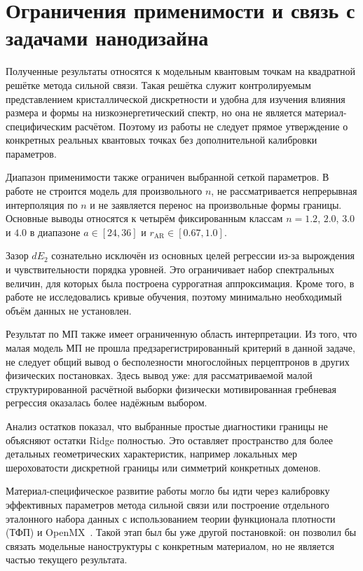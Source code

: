 \section{Ограничения применимости и связь с задачами нанодизайна}

Полученные результаты относятся к модельным квантовым точкам на квадратной решётке метода
сильной связи. Такая решётка служит контролируемым представлением кристаллической
дискретности и удобна для изучения влияния размера и формы на низкоэнергетический спектр,
но она не является материал-специфическим расчётом. Поэтому из работы не следует прямое
утверждение о конкретных реальных квантовых точках без дополнительной калибровки
параметров.

Диапазон применимости также ограничен выбранной сеткой параметров. В работе не строится
модель для произвольного $n$, не рассматривается непрерывная интерполяция по $n$ и не
заявляется перенос на произвольные формы границы. Основные выводы относятся к четырём
фиксированным классам $n=1.2$, $2.0$, $3.0$ и $4.0$ в диапазоне $a \in [24,36]$ и
$r_{\mathrm{AR}} \in [0.67,1.0]$.

Зазор $dE_2$ сознательно исключён из основных целей регрессии из-за вырождения и
чувствительности порядка уровней. Это ограничивает набор спектральных величин, для которых
была построена суррогатная аппроксимация. Кроме того, в работе не исследовались кривые
обучения, поэтому минимально необходимый объём данных не установлен.

Результат по МП также имеет ограниченную область интерпретации. Из того, что малая модель
МП не прошла предзарегистрированный критерий в данной задаче, не следует общий вывод о
бесполезности многослойных перцептронов в других физических постановках. Здесь вывод уже:
для рассматриваемой малой структурированной расчётной выборки физически мотивированная
гребневая регрессия оказалась более надёжным выбором.

Анализ остатков показал, что выбранные простые диагностики границы не объясняют остатки
Ridge полностью. Это оставляет пространство для более детальных геометрических
характеристик, например локальных мер шероховатости дискретной границы или симметрий
конкретных доменов.

Материал-специфическое развитие работы могло бы идти через калибровку эффективных
параметров метода сильной связи или построение отдельного эталонного набора данных с
использованием теории функционала плотности (ТФП) и OpenMX~\cite{hohenberg1964inhomogeneou
s,kohn1965selfconsistent,ozaki2003openmx}. Такой этап был бы уже другой постановкой: он
позволил бы связать модельные наноструктуры с конкретным материалом, но не является частью
текущего результата.

